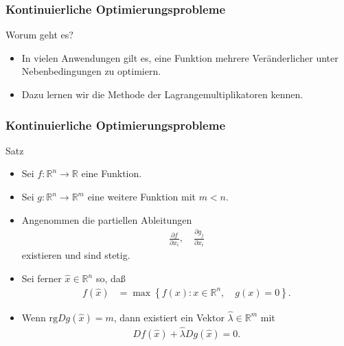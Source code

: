 \documentclass{beamer}
\title[Annuma]{\mytitle}
\author[Amin Coja-Oghlan]{Amin Coja-Oghlan}
\institute[Frankfurt]{JWGUFFM}
\date{}
\newcommand\RR{\mathbb R}
\newcommand\cbc[1]{\left\{{#1}\right\}}
\renewcommand{\ae}{\"a}
\newcommand{\rk}{\mathrm{rg}}
\newcommand{\mytitle}{Kontinuierliche Optimierungsprobleme}
\begin{document}
\frame[plain]{\titlepage}

\begin{frame}\frametitle{\mytitle}
	\begin{block}{Worum geht es?}
		\begin{itemize}
			\item In vielen Anwendungen gilt es, eine Funktion mehrere Ver\ae nderlicher unter Nebenbedingungen zu optimiern.
			\item Dazu lernen wir die Methode der Lagrangemultiplikatoren kennen.
		\end{itemize}
	\end{block}
\end{frame}

\begin{frame}\frametitle{\mytitle}
	\begin{block}{Satz}
	\begin{itemize}
	\item Sei $f:\RR^n\to\RR$ eine Funktion.
	\item Sei $g:\RR^n\to\RR^m$ eine weitere Funktion mit $m<n$.
	\item Angenommen die partiellen Ableitungen
		\begin{align*}
		\frac{\partial f}{\partial x_i},\quad\frac{\partial g_j}{\partial x_i}
		\end{align*}
		existieren und sind stetig.
	\item Sei ferner $\hat x\in\RR^n$ so, da\ss
		\begin{align*}
			f(\hat x)&=\max\cbc{f(x):x\in\RR^n,\quad g(x)=0}.
		\end{align*}
	\item Wenn $\rk Dg(\hat x)=m$, dann existiert ein Vektor $\hat\lambda\in\RR^m$ mit
		\begin{align*}
			Df(\hat x)+\hat\lambda Dg(\hat x)=0.
		\end{align*}
	\end{itemize}
	\end{block}
\end{frame}
\end{document}

